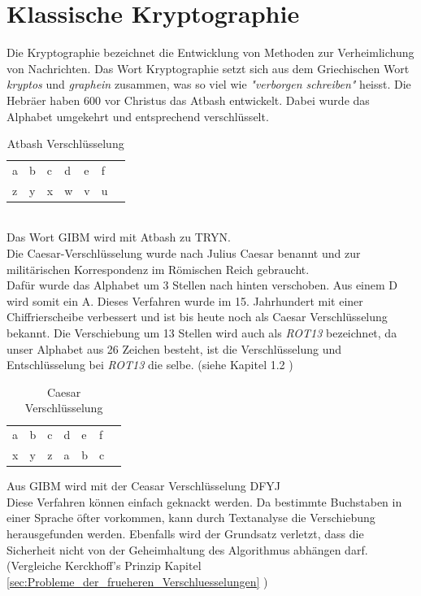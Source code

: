 \section{Klassische Kryptographie}
Die Kryptographie bezeichnet die Entwicklung von Methoden zur Verheimlichung von Nachrichten. Das Wort Kryptographie setzt sich aus dem Griechischen Wort \textit{kryptos} und \textit{graphein} zusammen, was so viel wie \textit{"verborgen schreiben"} heisst.%
Die Hebräer haben 600 vor Christus das Atbash entwickelt. Dabei wurde das Alphabet umgekehrt und entsprechend verschlüsselt.
%
\begin{table}[ht]
\caption{Atbash Verschlüsselung}
\begin{center}
\begin{tabular}{|l|l|l|l|l|l|l|}
  a & b & c & d & e & f\\
  z & y & x & w & v & u\\
\end{tabular}
\end{center}
\end{table} \\
%
Das Wort GIBM wird mit Atbash zu TRYN.\\
Die Caesar-Verschlüsselung wurde nach Julius Caesar benannt und zur militärischen Korrespondenz im Römischen Reich gebraucht.\\
Dafür wurde das Alphabet um 3 Stellen nach hinten verschoben. Aus einem D wird somit ein A. Dieses Verfahren wurde im 15. Jahrhundert mit einer Chiffrierscheibe verbessert und ist bis heute noch als Caesar Verschlüsselung bekannt. Die Verschiebung um 13 Stellen wird auch als \textit{ROT13} bezeichnet, da unser Alphabet aus 26 Zeichen besteht, ist die Verschlüsselung und Entschlüsselung bei \textit{ROT13} die selbe. (siehe Kapitel 1.2 \cite{kryptographie_Grundlagen} ) \\
%
\begin{table}[ht]
\caption{Caesar Verschlüsselung}
\begin{center}
\begin{tabular}{|l|l|l|l|l|l|l|}
  a & b & c & d & e & f\\
  x & y & z & a & b & c\\
\end{tabular}
\end{center}
\end{table}
%
Aus GIBM wird mit der Ceasar Verschlüsselung DFYJ \\
%
Diese Verfahren können einfach geknackt werden. Da bestimmte Buchstaben in einer Sprache öfter vorkommen, kann durch Textanalyse die Verschiebung herausgefunden werden. Ebenfalls wird der Grundsatz verletzt, dass die Sicherheit nicht von der Geheimhaltung des Algorithmus abhängen darf. (Vergleiche Kerckhoff's Prinzip Kapitel \ref{sec:Probleme_der_frueheren_Verschluesselungen} )
%
%
